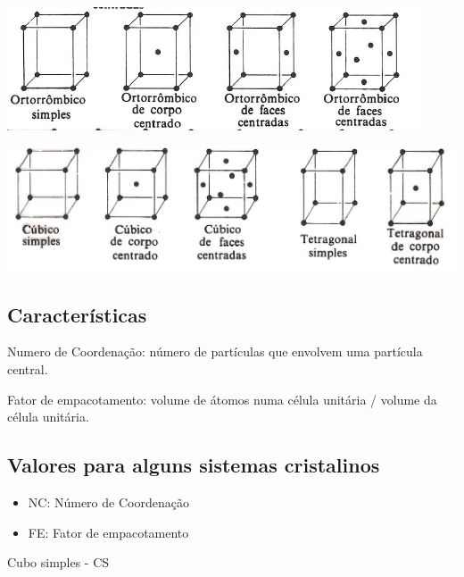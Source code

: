  \includegraphics[scale=0.45,trim={0 0 0 0}]{figures/var2}
 
 \includegraphics[scale=0.5,trim={0 0 0 0}]{figures/var3}



\subsection*{Características}

Numero de Coordenação: número de partículas que envolvem uma partícula central.

Fator de empacotamento: volume de átomos numa célula unitária / volume da célula unitária.

\subsection*{Valores para alguns sistemas cristalinos}

\begin{itemize}
	\setlength{\parskip}{0pt}
	\setlength{\itemsep}{0pt plus 1pt}
	
	\item NC: Número de Coordenação
	\item FE: Fator de empacotamento
\end{itemize}


Cubo simples - CS




